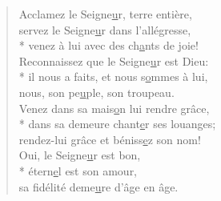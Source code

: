 
\begin{verse}
Acclamez le Seigne\underline{u}r, terre entière, \\
servez le Seigne\underline{u}r dans l’allégresse, \\*
venez à lui avec des ch\underline{a}nts de joie! \\

Reconnaissez que le Seigne\underline{u}r est Dieu: \\*
il nous a faits, et nous s\underline{o}mmes à lui, \\
nous, son pe\underline{u}ple, son troupeau. \\

Venez dans sa mais\underline{o}n lui rendre grâce, \\*
dans sa demeure chant\underline{e}r ses louanges; \\
rendez-lui grâce et béniss\underline{e}z son nom! \\

Oui, le Seigne\underline{u}r est bon, \\*
étern\underline{e}l est son amour, \\
sa fidélité deme\underline{u}re d’âge en âge. \\
\end{verse}

